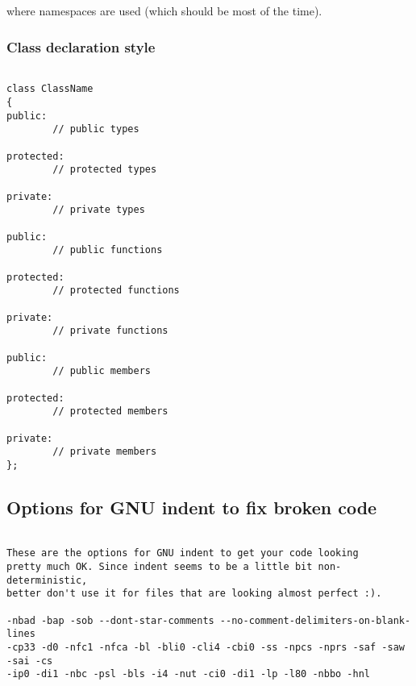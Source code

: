 where namespaces are used (which should be most of the time).

\subsubsection{Class declaration style}
\begin{verbatim}

class ClassName
{
public:
        // public types

protected:
        // protected types

private:
        // private types
        
public:
        // public functions

protected:
        // protected functions

private:
        // private functions

public:
        // public members

protected:
        // protected members

private:
        // private members
};

\end{verbatim}
\subsection{Options for GNU indent to fix broken code}
\begin{verbatim}

These are the options for GNU indent to get your code looking
pretty much OK. Since indent seems to be a little bit non-deterministic, 
better don't use it for files that are looking almost perfect :). 

-nbad -bap -sob --dont-star-comments --no-comment-delimiters-on-blank-lines
-cp33 -d0 -nfc1 -nfca -bl -bli0 -cli4 -cbi0 -ss -npcs -nprs -saf -saw -sai -cs
-ip0 -di1 -nbc -psl -bls -i4 -nut -ci0 -di1 -lp -l80 -nbbo -hnl

\end{verbatim}


